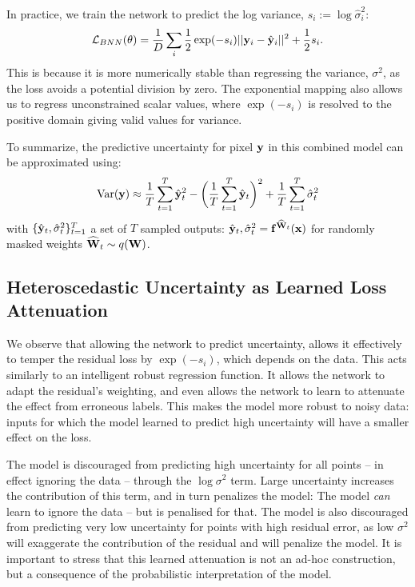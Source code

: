 In practice, we train the network to predict the log variance, $s_i := \log \hat{\sigma}_i^2$: 
\begin{equation}
\mathcal{L}_{BNN}(\theta) = \frac{1}{D} \sum_i \frac{1}{2} \exp (-s_i) ||\mathbf{y}_i-\hat{\mathbf{y}}_i||^2 + \frac{1}{2} s_i.
\label{eqn:aleatoric_regression_loss}
\end{equation}
This is because it is more numerically stable than regressing the variance, $\sigma^2$, as the loss avoids a potential division by zero. The exponential mapping also allows us to regress unconstrained scalar values, where $\exp(-s_i)$ is resolved to the positive domain giving valid values for variance.

To summarize, the predictive uncertainty for pixel $\mathbf{y}$ in this combined model can be approximated using:
\begin{equation}
\text{Var}(\mathbf{y}) \approx \frac{1}{T} \sum_{t=1}^T \hat{\mathbf{y}}_{t}^2
- \bigg( \frac{1}{T} \sum_{t=1}^T \hat{\mathbf{y}}_{t} \bigg)^2 + \frac{1}{T} \sum_{t=1}^T \hat{\sigma}_{t}^2
\end{equation}
with $\{ \hat{\mathbf{y}}_{t}, \hat{\sigma}_{t}^2 \}_{t=1}^T$ a set of $T$ sampled outputs: $\hat{\mathbf{y}}_{t}, \hat{\sigma}_{t}^2 = \mathbf{f}^{{\widehat{\mathbf{W}}}_t}(\mathbf{x})$ for randomly masked weights ${\widehat{\mathbf{W}}}_t \sim q(\mathbf{W})$.


\subsection{Heteroscedastic Uncertainty as Learned Loss Attenuation}

We observe that allowing the network to predict uncertainty, allows it effectively to temper the residual loss by $\exp(-s_i)$, which depends on the data. This acts similarly to an intelligent robust regression function. It allows the network to adapt the residual's weighting, and even allows the network to learn to attenuate the effect from erroneous labels. This makes the model more robust to noisy data: inputs for which the model learned to predict high uncertainty will have a smaller effect on the loss.

The model is discouraged from predicting high uncertainty for all points -- in effect ignoring the data -- through the $\log \sigma^2$ term. Large uncertainty increases the contribution of this term, and in turn penalizes the model: The model \textit{can} learn to ignore the data -- but is penalised for that. The model is also discouraged from predicting very low uncertainty for points with high residual error, as low $\sigma^2$ will exaggerate the contribution of the residual and will penalize the model. It is important to stress that this learned attenuation is not an ad-hoc construction, but a consequence of the probabilistic interpretation of the model. 

